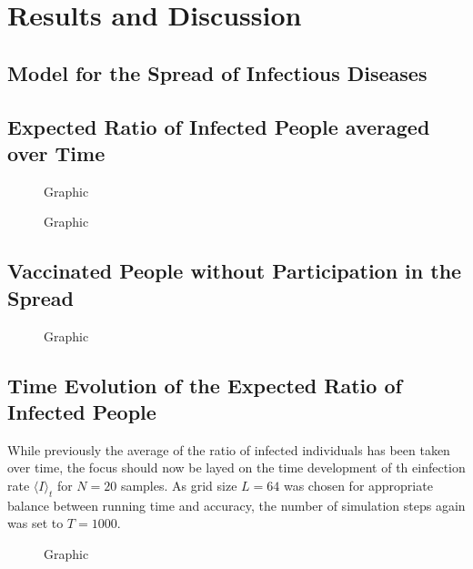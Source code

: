 \section{Results and Discussion}

\subsection{Model for the Spread of Infectious Diseases}

\subsection{Expected Ratio of Infected People averaged over Time}


\begin{figure}[ht]
    \centering
    \resizebox{\textwidth}{!}{}
    \caption{Graphic}\label{fig:Res_Dis_Avg_Inf_over_p1}
\end{figure}


\begin{figure}[ht]
    \centering
    \resizebox{\textwidth}{!}{}
    \caption{Graphic}\label{fig:Res_Dis_Avg_Inf_over_p1_L96}
\end{figure}

\subsection{Vaccinated People without Participation in the Spread}

\begin{figure}[ht]
    \centering
    \resizebox{\textwidth}{!}{}
    \caption{Graphic}\label{fig:Res_Dis_Avg_Inf_over_p4}
\end{figure}

\subsection{Time Evolution of the Expected Ratio of Infected People}

While previously the average of the ratio of infected individuals has been taken over time, the focus should now be layed on the time development of th einfection rate $\langle I\rangle_t$ for $N=20$ samples.
As grid size $L=64$ was chosen for appropriate balance between running time and accuracy, the number of simulation steps again was set to $T=1000$.


\begin{figure}[ht]
    \centering
    \resizebox{\textwidth}{!}{}
    \caption{Graphic}\label{fig:Avg_Inf_over_t}
\end{figure}

